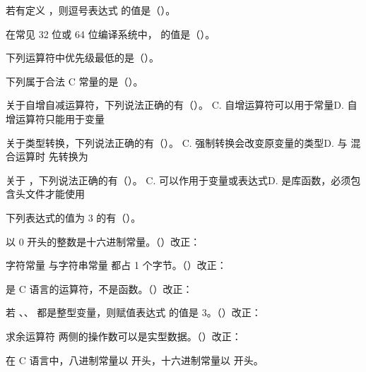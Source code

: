 \documentclass[a4paper,11pt]{article}
\begin{document}
\q 若有定义 ，则逗号表达式  的值是（\quad）。

\q 在常见 32 位或 64 位编译系统中， 的值是（\quad）。

\q 下列运算符中优先级最低的是（\quad）。


\q 下列属于合法 C 常量的是（\quad）。

\q 关于自增自减运算符，下列说法正确的有（\quad）。
{C. 自增运算符可以用于常量}{D. 自增运算符只能用于变量}

\q 关于类型转换，下列说法正确的有（\quad）。
{C. 强制转换会改变原变量的类型}{D.  与  混合运算时  先转换为 }

\q 关于 ，下列说法正确的有（\quad）。
{C.  可以作用于变量或表达式}{D.  是库函数，必须包含头文件才能使用}

\q 下列表达式的值为 3 的有（\quad）。


\q 以 0 开头的整数是十六进制常量。\quad（\quad）\quad 改正：\fixblank

\q 字符常量  与字符串常量  都占 1 个字节。\quad（\quad）\quad 改正：\fixblank

\q {} 是 C 语言的运算符，不是函数。\quad（\quad）\quad 改正：\fixblank

\q 若 、、 都是整型变量，则赋值表达式  的值是 3。\quad（\quad）\quad 改正：\fixblank

\q 求余运算符 \code{\%} 两侧的操作数可以是实型数据。\quad（\quad）\quad 改正：\fixblank


\q 在 C 语言中，八进制常量以 \fillblank{} 开头，十六进制常量以 \fillblank{} 开头。
\end{document}

